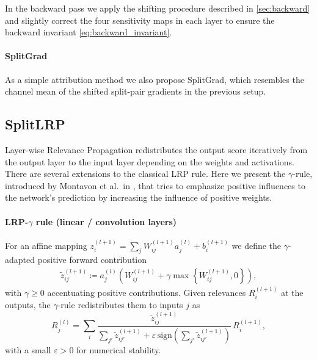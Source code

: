 In the backward pass we apply the shifting procedure described in \cref{sec:backward} and slightly correct the four sensitivity maps in each layer to ensure the backward invariant \cref{eq:backward_invariant}.

\paragraph{SplitGrad} As a simple attribution method we also propose SplitGrad, which resembles the channel mean of the shifted split-pair gradients in the previous setup.

\subsection{SplitLRP}\label{subsec:split_lrp}

Layer-wise Relevance Propagation \citep{Bach2015} redistributes the output score iteratively from the
output layer to the input layer depending on the weights and activations. There are several extensions to the classical LRP rule. 
Here we present the $\gamma$-rule, introduced by Montavon et al.\ in \citep{Montavon_2022_gammaLRP}, that tries to emphasize positive influences to the network's prediction by increasing the influence of positive weights.

\paragraph{LRP-\(\gamma\) rule (linear / convolution layers)}
For an affine mapping \(z^{(l+1)}_i=\sum_j W^{(l+1)}_{ij} a^{(l)}_j + b^{(l+1)}_i\) we define the $\gamma$-adapted positive forward contribution
\begin{align}
    \tilde{z}^{(l+1)}_{ij} \coloneqq a^{(l)}_j \left( W^{(l+1)}_{ij} + \gamma \max\left\{W^{(l+1)}_{ij},0\right\} \right),
\end{align}
with \(\gamma \ge 0\) accentuating positive contributions.
Given relevances \(R^{(l+1)}_i\) at the outputs, the \(\gamma\)-rule redistributes them to inputs \(j\) as
\begin{equation}
\label{eq:lrp-gamma}
R^{(l)}_j = \sum_i \frac{\tilde{z}^{(l+1)}_{ij}}{\sum_{j'} \tilde{z}^{(l+1)}_{ij'} + \varepsilon\,\mathrm{sign}\!\left(\sum_{j'} \tilde{z}^{(l+1)}_{ij'}\right)}\, R^{(l+1)}_i,
\end{equation}
with a small \(\varepsilon>0\) for numerical stability.


